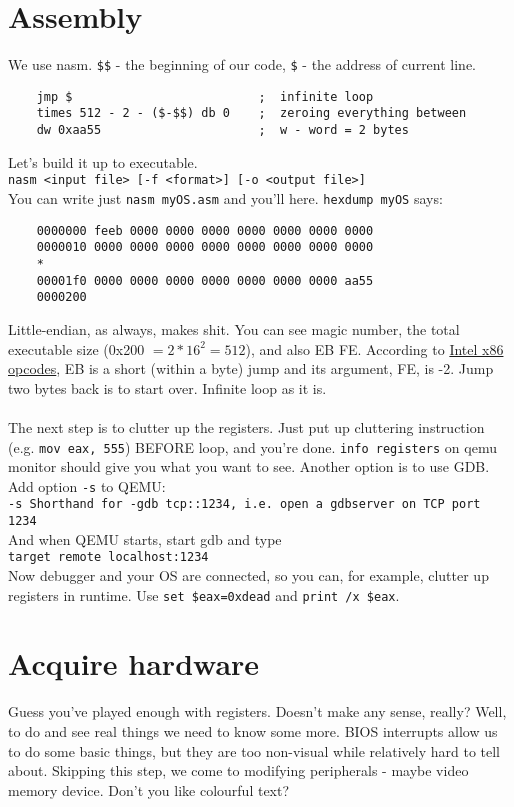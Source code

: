 \documentclass[14pt]{extarticle}
\begin{document}
\section{Assembly}
We use nasm. \texttt{\$\$} - the beginning of our code, \texttt{\$} - the 
address of current line. 
\begin{verbatim}
    jmp $                          ;  infinite loop
    times 512 - 2 - ($-$$) db 0    ;  zeroing everything between
    dw 0xaa55                      ;  w - word = 2 bytes 
\end{verbatim}
Let's build it up to executable.\\
\texttt{nasm <input file> [-f <format>] [-o <output file>]}\\
You can write just \texttt{nasm myOS.asm} and you'll here. 
\texttt{hexdump myOS} says:
\begin{verbatim}
    0000000 feeb 0000 0000 0000 0000 0000 0000 0000
    0000010 0000 0000 0000 0000 0000 0000 0000 0000
    *
    00001f0 0000 0000 0000 0000 0000 0000 0000 aa55
    0000200
\end{verbatim}
Little-endian, as always, makes shit. You can see magic number, 
the total executable size (0x200 $= 2*16^2 = 512$), and also EB FE. 
According to \href{http://sparksandflames.com/files/x86InstructionChart.html}
{Intel x86 opcodes}, EB is a short (within a byte) jump and 
its argument, FE, is -2. 
Jump two bytes back is to start over. Infinite loop as it is. 
\\\\
The next step is to clutter up the registers. Just put up cluttering 
instruction (e.g. \texttt{mov eax, 555}) BEFORE loop, and you're done. 
\texttt{info registers} on qemu monitor should give you what you want to see. 
Another option is to use GDB. Add option \texttt{-s} to QEMU:\\
\texttt{-s Shorthand for -gdb tcp::1234, i.e. open a gdbserver 
on TCP port 1234}\\
And when QEMU starts, start gdb and type\\
\texttt{target remote localhost:1234}\\
Now debugger and your OS are connected, so you can, for example, 
clutter up registers in runtime. Use \texttt{set \$eax=0xdead} and
\texttt{print /x \$eax}. 

\section{Acquire hardware}
Guess you've played enough with registers. Doesn't make any sense, really?
Well, to do and see real things we need to know some more. 
BIOS interrupts allow us to do some basic things, but they are too 
non-visual while relatively hard to tell about. Skipping this step, we come 
to modifying peripherals - maybe video memory device. Don't you like 
colourful text? 
\end{document}
